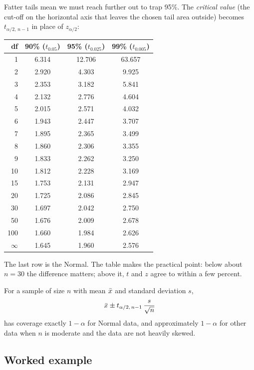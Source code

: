 Fatter tails mean we must reach further out to trap 95\%. The \emph{critical
value} (the cut-off on the horizontal axis that leaves the chosen tail area
outside) becomes $t_{\alpha/2,\,n-1}$ in place of $z_{\alpha/2}$:

\begin{center}
\begin{tabular}{rccc}
\toprule
df & 90\% ($t_{0.05}$) & 95\% ($t_{0.025}$) & 99\% ($t_{0.005}$) \\
\midrule
1   & 6.314 & 12.706 & 63.657 \\
2   & 2.920 & 4.303 & 9.925 \\
3   & 2.353 & 3.182 & 5.841 \\
4   & 2.132 & 2.776 & 4.604 \\
5   & 2.015 & 2.571 & 4.032 \\
6   & 1.943 & 2.447 & 3.707 \\
7   & 1.895 & 2.365 & 3.499 \\
8   & 1.860 & 2.306 & 3.355 \\
9   & 1.833 & 2.262 & 3.250 \\
10  & 1.812 & 2.228 & 3.169 \\
15  & 1.753 & 2.131 & 2.947 \\
20  & 1.725 & 2.086 & 2.845 \\
30  & 1.697 & 2.042 & 2.750 \\
50  & 1.676 & 2.009 & 2.678 \\
100 & 1.660 & 1.984 & 2.626 \\
$\infty$ & 1.645 & 1.960 & 2.576 \\
\bottomrule
\end{tabular}
\end{center}

The last row is the Normal. The table makes the practical point: below about
$n=30$ the difference matters; above it, $t$ and $z$ agree to within a few
percent.

\begin{theorem}
For a sample of size $n$ with mean $\bar{x}$ and standard deviation $s$,
\[
  \bar{x} \pm t_{\alpha/2,\,n-1}\,\frac{s}{\sqrt n}
\]
has coverage exactly $1-\alpha$ for Normal data, and approximately $1-\alpha$
for other data when $n$ is moderate and the data are not heavily skewed.
\end{theorem}

\subsection{Worked example}

